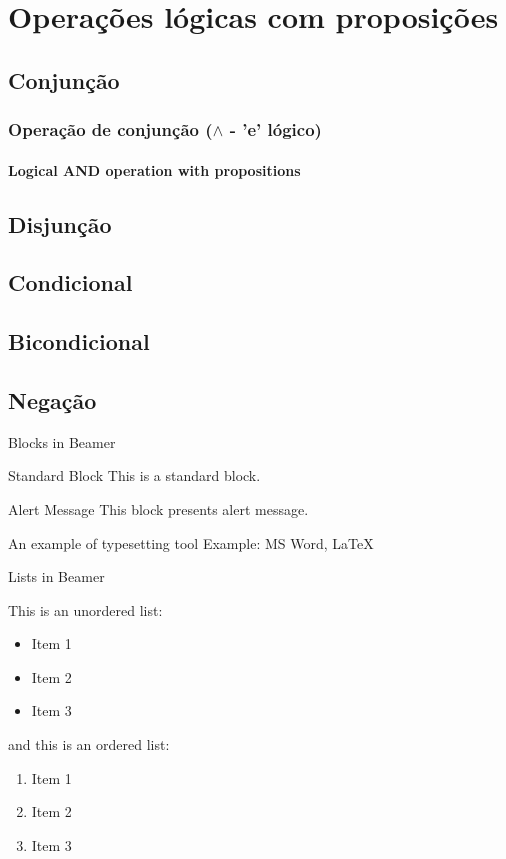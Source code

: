 \documentclass[10pt]{beamer}
\begin{document}
\section{Operações lógicas com proposições}
%
\subsection{Conjunção}
%
\begin{frame}
    \frametitle{Operação de conjunção ($\land$ - 'e' lógico)}
    \framesubtitle{Logical AND operation with propositions}
\end{frame}
%
\subsection{Disjunção}
%
\subsection{Condicional}
%
\subsection{Bicondicional}
%
\subsection{Negação}

\begin{frame}{Blocks in Beamer}
    \begin{block}{Standard Block}
        This is a standard block.
    \end{block}
    \begin{alertblock}{Alert Message}
        This block presents alert message.
    \end{alertblock}
    \begin{exampleblock}{An example of typesetting tool}
        Example: MS Word, \LaTeX{}
    \end{exampleblock}
\end{frame}
%
\begin{frame}{Lists in Beamer}

    This is an unordered list:
    \begin{itemize}
        \item Item 1
        \item Item 2
        \item Item 3
    \end{itemize}
    
    and this is an ordered list:
    \begin{enumerate}
        \item Item 1
        \item Item 2
        \item Item 3
    \end{enumerate}
    
    \end{frame}
\end{document}
